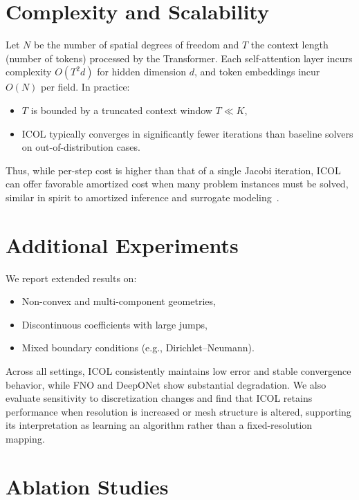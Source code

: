\documentclass{article}
\begin{document}
\section{Complexity and Scalability}
\label{app:complexity}

Let $N$ be the number of spatial degrees of freedom and $T$ the context length (number of tokens) processed by the Transformer. Each self-attention layer incurs complexity $O(T^2 d)$ for hidden dimension $d$, and token embeddings incur $O(N)$ per field. In practice:
\begin{itemize}
\item $T$ is bounded by a truncated context window $T \ll K$,
\item ICOL typically converges in significantly fewer iterations than baseline solvers on out-of-distribution cases.
\end{itemize}
Thus, while per-step cost is higher than that of a single Jacobi iteration, ICOL can offer favorable amortized cost when many problem instances must be solved, similar in spirit to amortized inference and surrogate modeling~\cite{sun2019surrogate,brandstetter2022message}.

\section{Additional Experiments}
\label{app:experiments}

We report extended results on:
\begin{itemize}
\item Non-convex and multi-component geometries,
\item Discontinuous coefficients with large jumps,
\item Mixed boundary conditions (e.g., Dirichlet--Neumann).
\end{itemize}

Across all settings, ICOL consistently maintains low error and stable convergence behavior, while FNO and DeepONet show substantial degradation. We also evaluate sensitivity to discretization changes and find that ICOL retains performance when resolution is increased or mesh structure is altered, supporting its interpretation as learning an algorithm rather than a fixed-resolution mapping.

\section{Ablation Studies}
\label{app:ablation}
\end{document}
